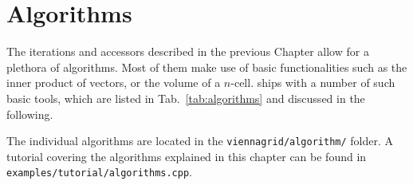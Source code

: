 \chapter{Algorithms} \label{chap:algorithms}
The iterations and accessors described in the previous Chapter allow for a plethora of algorithms.
Most of them make use of basic functionalities such as the inner product of vectors, or the volume of a $n$-cell.
{\ViennaGrid} ships with a number of such basic tools, which are listed in Tab.~\ref{tab:algorithms} and discussed in the following.

The individual algorithms are located in the \lstinline|viennagrid/algorithm/| folder.
A tutorial covering the algorithms explained in this chapter can be found in \lstinline|examples/tutorial/algorithms.cpp|.



